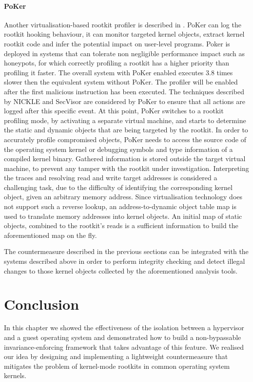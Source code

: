 \paragraph{PoKer}
Another virtualisation-based rootkit profiler is described in \cite{PoKer}. PoKer can log the rootkit hooking behaviour, it can monitor targeted kernel objects, extract kernel rootkit code and infer the potential impact on user-level programs. Poker is deployed in systems that can tolerate non negligible performance impact such as honeypots, for which correctly profiling a rootkit has a higher priority than profiling it faster. The overall system with PoKer enabled executes 3.8 times slower then the equivalent system without PoKer.
The profiler will be enabled after the first malicious instruction has been executed. The techniques described by NICKLE and SecVisor are considered by PoKer to ensure that all actions are logged after this specific event.
At this point, PoKer switches to a rootkit profiling mode, by activating a separate virtual machine, and starts to determine the static and dynamic objects that are being targeted by the rootkit. In order to accurately profile compromised objects, PoKer needs to access the source code of the operating system kernel or debugging symbols and type information of a compiled kernel binary. Gathered information is stored outside the target virtual machine, to prevent any tamper with the rootkit under investigation.
Interpreting the traces and resolving read and write target addresses is considered a challenging task, due to the difficulty of identifying the corresponding kernel object, given an arbitrary memory address.
Since virtualisation technology does not support such a reverse lookup, an address-to-dynamic object table map is used to translate memory addresses into kernel objects. An initial map of static objects, combined to the rootkit's reads is a sufficient information to build the aforementioned map on the fly.



The countermeasure described in the previous sections can be integrated with the systems described above in order to perform integrity checking and detect illegal changes to those kernel objects collected by the aforementioned analysis tools.


\section{Conclusion}\label{hr:conclusion}
In this chapter we showed the effectiveness of the isolation between a hypervisor and a guest operating system and demonstrated how to build a non-bypassable invariance-enforcing framework that takes advantage of this feature.
We realised our idea by designing and implementing a lightweight countermeasure that mitigates the problem of kernel-mode rootkits in common operating system kernels.

